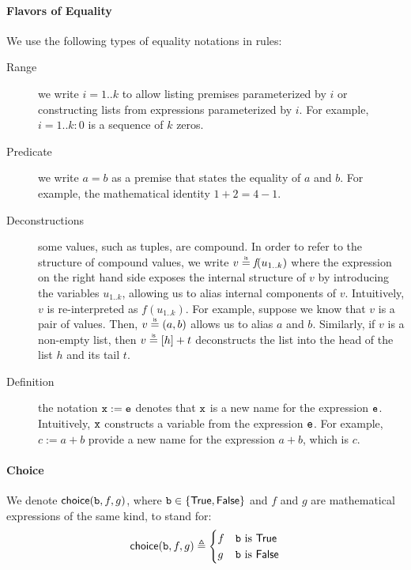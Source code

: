 \paragraph{Flavors of Equality}
We use the following types of equality notations in rules:
\begin{description}
  \item[Range] we write $i=1..k$ to allow listing premises parameterized by $i$ or constructing
  lists from expressions parameterized by $i$.
  For example, $i=1..k: 0$ is a sequence of $k$ zeros.
  \item[Predicate] we write $a = b$ as a premise that states the equality of $a$ and $b$.
  For example, the mathematical identity $1 + 2 = 4 - 1$.
  \item[Deconstructions] some values, such as tuples, are compound. In order to refer to the structure
  of compound values, we write $v \eqname \textit{f}(u_{1..k})$ where the expression on the right
  hand side exposes the internal structure of $v$ by introducing the variables
  $u_{1..k}$, allowing us to alias internal components of $v$.
  Intuitively, $v$ is re-interpreted as $\textit{f}(u_{1..k})$.
  For example, suppose we know that $v$ is a pair of values.
  Then, $v \eqname (a, b)$ allows us to alias $a$ and $b$.
  Similarly, if $v$ is a non-empty list, then $v \eqname [h] + t$ deconstructs the list into the
  head of the list $h$ and its tail $t$.
  \item[Definition] the notation $\texttt{x} := \texttt{e}$ denotes that $\texttt{x}$ is a new name for the expression $\texttt{e}$.
  Intuitively, $\texttt{x}$ constructs a variable from the expression $\texttt{e}$.
  For example, $c := a + b$ provide a new name for the expression $a+b$, which is $c$.
\end{description}

\paragraph{Choice}
\newcommand\choice[0]{\textsf{choice}}
We denote $\choice(\vb, f, g)$, where $\texttt{b} \in \{\textsf{True}, \textsf{False}\}$ and $f$ and $g$
are mathematical expressions of the same kind, to stand for:
\[
  \choice(\vb, f, g) \triangleq \begin{cases}
    f & \vb \text{ is }\True\\
    g & \vb \text{ is }\False\\
  \end{cases}
\]
